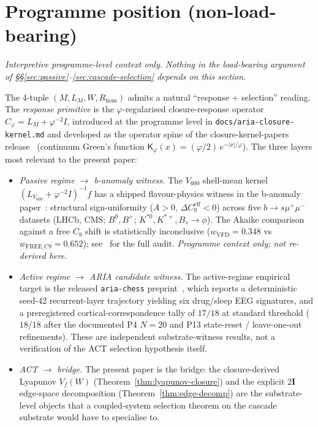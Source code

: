 \documentclass[11pt]{article}
\theoremstyle{definition}
\newcommand{\twoI}{2\mathbf{I}}
\begin{document}
\section{Programme position (non-load-bearing)}\label{sec:aria_home}

\emph{Interpretive programme-level context only. Nothing in the load-bearing argument of \S\S\ref{sec:passive}--\ref{sec:cascade-selection} depends on this section.}\medskip

The 4-tuple $(M, L_M, W, R_{\mathrm{hom}})$ admits a natural ``response + selection'' reading. The \emph{response primitive} is the $\varphi$-regularised closure-response operator $C_\varphi = L_M + \varphi^{-2} I$, introduced at the programme level in \texttt{docs/aria-closure-kernel.md} and developed as the operator spine of the closure-kernel-papers release~\citep{SmartARIAClosureKernel2026} (continuum Green's function $\mathsf K_\varphi(x) = (\varphi/2)\,e^{-|x|/\varphi}$). The three layers most relevant to the present paper:

\begin{itemize}
\item \emph{Passive regime $\to$ b-anomaly witness.} The $V_{600}$ shell-mean kernel $(L_{V_{600}} + \varphi^{-2}I)^{-1} f$ has a shipped flavour-physics witness in the b-anomaly paper~\citep{SmartBAnomaly}: structural sign-uniformity ($A > 0$, $\Delta C_9^{\mathrm{eff}} < 0$) across five $b \to s\mu^+\mu^-$ datasets (LHCb, CMS; $B^0, B^+$; $K^{*0}, K^{*+}, B_s \to \phi$). The Akaike comparison against a free $C_9$ shift is statistically inconclusive ($w_{\mathrm{VFD}} = 0.348$ vs $w_{\mathrm{FREE\_C9}} = 0.652$); see~\citep{SmartBAnomaly} for the full audit. \emph{Programme context only; not re-derived here.}
\item \emph{Active regime $\to$ ARIA candidate witness.} The active-regime empirical target is the released \texttt{aria-chess} preprint~\citep{SmartARIAChess2026}, which reports a deterministic seed-42 recurrent-layer trajectory yielding six drug/sleep EEG signatures, and a preregistered cortical-correspondence tally of $17/18$ at standard threshold ($18/18$ after the documented P4 $N=20$ and P13 state-reset / leave-one-out refinements). These are independent substrate-witness results, not a verification of the ACT selection hypothesis itself.
\item \emph{ACT $\to$ bridge.} The present paper is the bridge: the closure-derived Lyapunov $V_f(W)$ (Theorem~\ref{thm:lyapunov-closure}) and the explicit $\twoI$ edge-space decomposition (Theorem~\ref{thm:edge-decomp}) are the substrate-level objects that a coupled-system selection theorem on the cascade substrate would have to specialise to.
\end{itemize}
\end{document}
